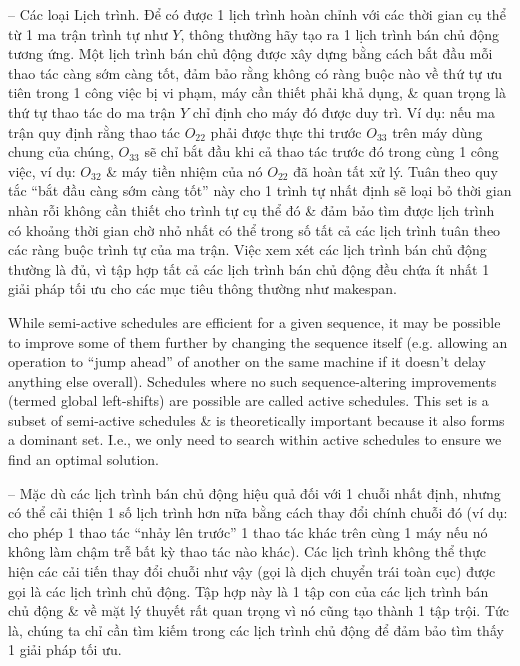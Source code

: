 \documentclass{article}
\begin{document}
\begin{itemize}
\begin{itemize}
\begin{itemize}
            -- {\sf Các loại Lịch trình.} Để có được 1 lịch trình hoàn chỉnh với các thời gian cụ thể từ 1 ma trận trình tự như $Y$, thông thường hãy tạo ra 1 lịch trình bán chủ động tương ứng. Một lịch trình bán chủ động được xây dựng bằng cách bắt đầu mỗi thao tác càng sớm càng tốt, đảm bảo rằng không có ràng buộc nào về thứ tự ưu tiên trong 1 công việc bị vi phạm, máy cần thiết phải khả dụng, \& quan trọng là thứ tự thao tác do ma trận $Y$ chỉ định cho máy đó được duy trì. Ví dụ: nếu ma trận quy định rằng thao tác $O_{22}$ phải được thực thi trước $O_{33}$ trên máy dùng chung của chúng, $O_{33}$ sẽ chỉ bắt đầu khi cả thao tác trước đó trong cùng 1 công việc, ví dụ: $O_{32}$ \& máy tiền nhiệm của nó $O_{22}$ đã hoàn tất xử lý. Tuân theo quy tắc ``bắt đầu càng sớm càng tốt'' này cho 1 trình tự nhất định sẽ loại bỏ thời gian nhàn rỗi không cần thiết cho trình tự cụ thể đó \& đảm bảo tìm được lịch trình có khoảng thời gian chờ nhỏ nhất có thể trong số tất cả các lịch trình tuân theo các ràng buộc trình tự của ma trận. Việc xem xét các lịch trình bán chủ động thường là đủ, vì tập hợp tất cả các lịch trình bán chủ động đều chứa ít nhất 1 giải pháp tối ưu cho các mục tiêu thông thường như makespan.

            While semi-active schedules are efficient for a given sequence, it may be possible to improve some of them further by changing the sequence itself (e.g. allowing an operation to ``jump ahead'' of another on the same machine if it doesn't delay anything else overall). Schedules where no such sequence-altering improvements (termed global left-shifts) are possible are called active schedules. This set is a subset of semi-active schedules \& is theoretically important because it also forms a dominant set. I.e., we only need to search within active schedules to ensure we find an optimal solution.

            -- Mặc dù các lịch trình bán chủ động hiệu quả đối với 1 chuỗi nhất định, nhưng có thể cải thiện 1 số lịch trình hơn nữa bằng cách thay đổi chính chuỗi đó (ví dụ: cho phép 1 thao tác ``nhảy lên trước'' 1 thao tác khác trên cùng 1 máy nếu nó không làm chậm trễ bất kỳ thao tác nào khác). Các lịch trình không thể thực hiện các cải tiến thay đổi chuỗi như vậy (gọi là dịch chuyển trái toàn cục) được gọi là các lịch trình chủ động. Tập hợp này là 1 tập con của các lịch trình bán chủ động \& về mặt lý thuyết rất quan trọng vì nó cũng tạo thành 1 tập trội. Tức là, chúng ta chỉ cần tìm kiếm trong các lịch trình chủ động để đảm bảo tìm thấy 1 giải pháp tối ưu.


\end{itemize}
\end{itemize}
\end{itemize}
\end{document}
